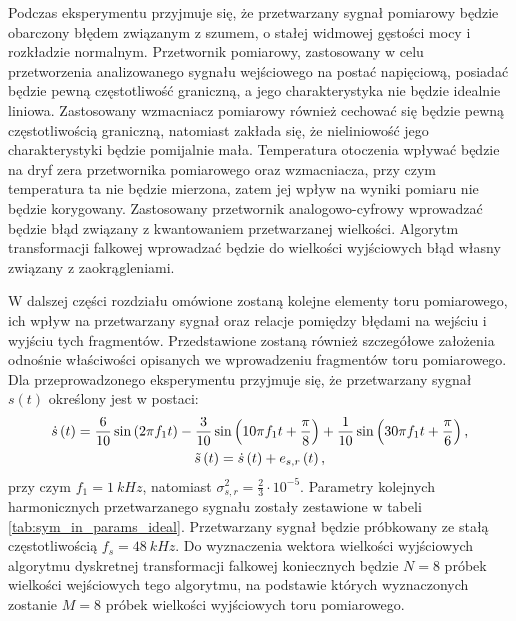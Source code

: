 Podczas eksperymentu przyjmuje się, że przetwarzany sygnał pomiarowy będzie obarczony błędem związanym z szumem, o stałej widmowej gęstości mocy i rozkładzie normalnym. Przetwornik pomiarowy, zastosowany w celu przetworzenia analizowanego sygnału wejściowego na postać napięciową, posiadać będzie pewną częstotliwość graniczną, a jego charakterystyka nie będzie idealnie liniowa. Zastosowany wzmacniacz pomiarowy również cechować się będzie pewną częstotliwością graniczną, natomiast zakłada się, że nieliniowość jego charakterystyki będzie pomijalnie mała. Temperatura otoczenia wpływać będzie na dryf zera przetwornika pomiarowego oraz wzmacniacza, przy czym temperatura ta nie będzie mierzona, zatem jej wpływ na wyniki pomiaru nie będzie korygowany. Zastosowany przetwornik analogowo-cyfrowy wprowadzać będzie błąd związany z kwantowaniem przetwarzanej wielkości. Algorytm transformacji falkowej wprowadzać będzie do wielkości wyjściowych błąd własny związany z zaokrągleniami.

W dalszej części rozdziału omówione zostaną kolejne elementy toru pomiarowego, ich wpływ na przetwarzany sygnał oraz relacje pomiędzy błędami na wejściu i wyjściu tych fragmentów. Przedstawione zostaną również szczegółowe założenia odnośnie właściwości opisanych we wprowadzeniu fragmentów toru pomiarowego. Dla przeprowadzonego eksperymentu przyjmuje się, że przetwarzany sygnał $s(t)$ określony jest w postaci:
\begin{gather}
\dot{s} \left(t\right) = \frac{6}{10} \sin \left( 2 \pi f_{1} t \right) - \frac{3}{10} \sin \left( 10 \pi f_{1} t + \frac{\pi}{8} \right) + \frac{1}{10} \sin \left( 30 \pi f_{1} t + \frac{\pi}{6} \right) \label{eq:sym_in_ideal}, \\
\tilde{s} \left(t\right) = \dot{s} \left(t\right) + e_{s,r} \left(t\right) \label{eq:sym_in_real},
\end{gather}
przy czym $f_{1} = \qty{1}{kHz}$, natomiast $\sigma_{s,r}^{2} = \frac{2}{3} \cdot 10^{-5}$. Parametry kolejnych harmonicznych przetwarzanego sygnału zostały zestawione w tabeli \ref{tab:sym_in_params_ideal}. Przetwarzany sygnał będzie próbkowany ze stałą częstotliwością $f_{s} = \qty{48}{kHz}$. Do wyznaczenia wektora wielkości wyjściowych algorytmu dyskretnej transformacji falkowej koniecznych będzie $N = 8$ próbek wielkości wejściowych tego algorytmu, na podstawie których wyznaczonych zostanie $M = 8$ próbek wielkości wyjściowych toru pomiarowego.

